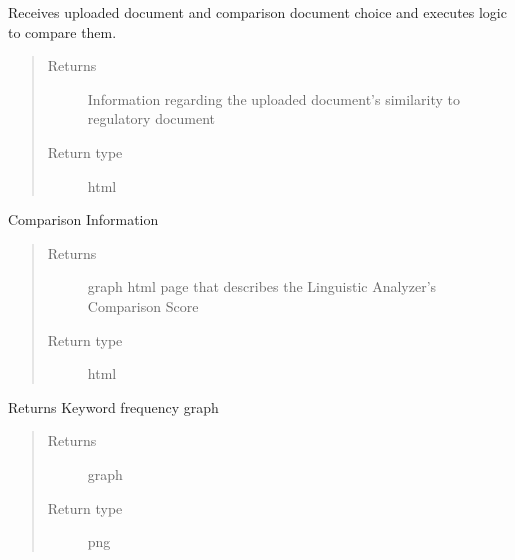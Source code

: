 \documentclass[letterpaper,10pt,english]{sphinxmanual}
\begin{document}
\begin{fulllineitems}
\label{\detokenize{app:app.analyze}}
Receives uploaded document and comparison document choice and executes logic to compare them.
\begin{quote}\begin{description}
\item[{Returns}] \leavevmode
Information regarding the uploaded document’s similarity to regulatory document

\item[{Return type}] \leavevmode
html

\end{description}\end{quote}

\end{fulllineitems}


\begin{fulllineitems}
\label{\detokenize{app:app.comparisoninfo}}
Comparison Information
\begin{quote}\begin{description}
\item[{Returns}] \leavevmode
graph html page that describes the Linguistic Analyzer’s Comparison Score

\item[{Return type}] \leavevmode
html

\end{description}\end{quote}

\end{fulllineitems}


\begin{fulllineitems}
\label{\detokenize{app:app.getkwfreeqimage}}
Returns Keyword frequency graph
\begin{quote}\begin{description}
\item[{Returns}] \leavevmode
graph

\item[{Return type}] \leavevmode
png

\end{description}\end{quote}

\end{fulllineitems}
\end{document}
